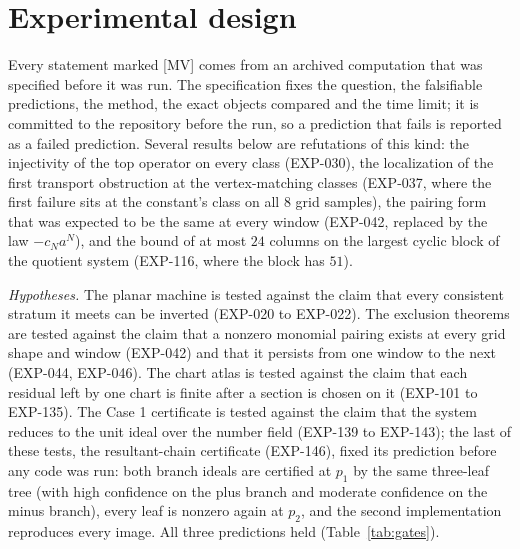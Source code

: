 \documentclass[11pt]{article}
\theoremstyle{remark}
\begin{document}
\section{Experimental design}\label{sec:design}

Every statement marked [MV] comes from an archived computation that was specified before it was run. The specification
fixes the question, the falsifiable predictions, the method, the exact objects compared and the time limit; it is committed to
the repository before the run, so a prediction that fails is reported as a failed prediction. Several results below are
refutations of this kind: the injectivity of the top operator on every class (EXP-030), the localization of the first transport
obstruction at the vertex-matching classes (EXP-037, where the first failure sits at the constant's class on all $8$ grid
samples), the pairing form that was expected to be the same at every window (EXP-042, replaced by the law $-c_Na^N$), and the
bound of at most $24$ columns on the largest cyclic block of the quotient system (EXP-116, where the block has $51$).

\emph{Hypotheses.} The planar machine is tested against the claim that every consistent stratum it meets can be inverted
(EXP-020 to EXP-022). The exclusion theorems are tested against the claim that a nonzero monomial pairing exists at every grid shape
and window (EXP-042) and that it persists from one window to the next (EXP-044, EXP-046). The chart atlas is tested against
the claim that each residual left by one chart is finite after a section is chosen on it (EXP-101 to EXP-135). The Case 1
certificate is tested against the claim that the system reduces to the unit ideal over the number field (EXP-139 to EXP-143); the last of these tests, the
resultant-chain certificate (EXP-146), fixed its prediction before any code was run: both branch ideals are certified at $p_1$ by the same three-leaf tree
(with high confidence on the plus branch and moderate confidence on the minus branch), every leaf is nonzero again at $p_2$, and the second implementation
reproduces every image. All three predictions held (Table~\ref{tab:gates}).
\end{document}
